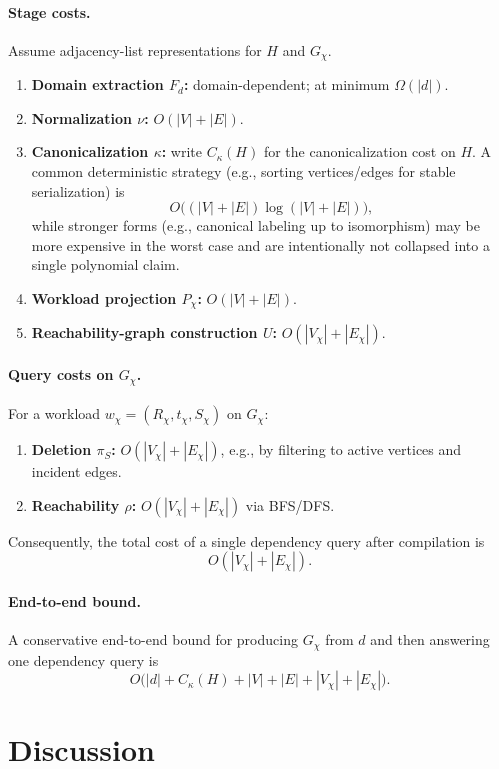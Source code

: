 \documentclass[11pt]{article}
\begin{document}
\paragraph{Stage costs.}
Assume adjacency-list representations for $H$ and $G_\chi$.
\begin{enumerate}[label=(\roman*),leftmargin=*]
    \item \textbf{Domain extraction $F_d$:} domain-dependent; at minimum $\Omega(|d|)$.
    \item \textbf{Normalization $\nu$:} $O(|V|+|E|)$.
    \item \textbf{Canonicalization $\kappa$:} write $C_\kappa(H)$ for the canonicalization cost on $H$.
    A common deterministic strategy (e.g., sorting vertices/edges for stable serialization) is
    \[
    O\bigl((|V|+|E|)\log(|V|+|E|)\bigr),
    \]
    while stronger forms (e.g., canonical labeling up to isomorphism) may be more expensive in the worst case and are intentionally not collapsed into a single polynomial claim.
    \item \textbf{Workload projection $P_\chi$:} $O(|V|+|E|)$.
    \item \textbf{Reachability-graph construction $U$:} $O(|V_\chi|+|E_\chi|)$.
\end{enumerate}

\paragraph{Query costs on $G_\chi$.}
For a workload $w_\chi=(R_\chi,t_\chi,S_\chi)$ on $G_\chi$:
\begin{enumerate}[label=(\roman*),leftmargin=*]
    \item \textbf{Deletion $\pi_S$:} $O(|V_\chi|+|E_\chi|)$, e.g., by filtering to active vertices and incident edges.
    \item \textbf{Reachability $\rho$:} $O(|V_\chi|+|E_\chi|)$ via BFS/DFS.
\end{enumerate}
Consequently, the total cost of a single dependency query after compilation is
\[
O(|V_\chi|+|E_\chi|).
\]

\paragraph{End-to-end bound.}
A conservative end-to-end bound for producing $G_\chi$ from $d$ and then answering one dependency query is
\[
O\bigl(|d| + C_\kappa(H) + |V| + |E| + |V_\chi| + |E_\chi|\bigr).
\]

\section{Discussion}
\label{sec:discussion}
\end{document}
